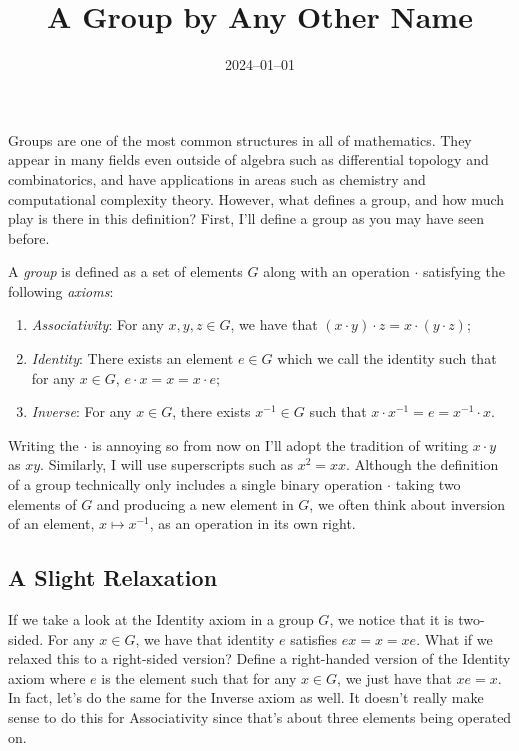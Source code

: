\documentclass{article}
\title{A Group by Any Other Name}
\date{2024--01--01}
\begin{document}
\maketitle

Groups are one of the most common structures in all of mathematics.
They appear in many fields even outside of algebra such as differential topology and combinatorics, and have applications in areas such as chemistry and computational complexity theory.
However, what defines a group, and how much play is there in this definition?
First, I'll define a group as you may have seen before.

\begin{defn}\label{defn:grp}
  A \emph{group} is defined as a set of elements $G$ along with an operation $\cdot$ satisfying the following \emph{axioms}:
  \begin{enumerate}
  \item \emph{Associativity}: For any $x, y, z \in G$, we have that $(x \cdot y) \cdot z = x \cdot (y \cdot z)$;
  \item \emph{Identity}: There exists an element $e \in G$ which we call the identity such that for any $x \in G$, $e \cdot x = x = x \cdot e$;
  \item \emph{Inverse}: For any $x \in G$, there exists $x^{-1} \in G$ such that $x \cdot x^{-1} = e = x^{-1} \cdot x$.
  \end{enumerate}
\end{defn}

Writing the $\cdot$ is annoying so from now on I'll adopt the tradition of writing $x \cdot y$ as $xy$.
Similarly, I will use superscripts such as $x^{2} = xx$.
Although the definition of a group technically only includes a single binary operation $\cdot$ taking two elements of $G$ and producing a new element in $G$, we often think about inversion of an element, $x \mapsto x^{-1}$, as an operation in its own right.

\subsection*{A Slight Relaxation}

If we take a look at the Identity axiom in a group $G$, we notice that it is two-sided.
For any $x \in G$, we have that identity $e$ satisfies $ex = x = xe$.
What if we relaxed this to a right-sided version?
Define a right-handed version of the Identity axiom where $e$ is the element such that for any $x \in G$, we just have that $xe = x$.
In fact, let's do the same for the Inverse axiom as well.
It doesn't really make sense to do this for Associativity since that's about three elements being operated on.
\end{document}
